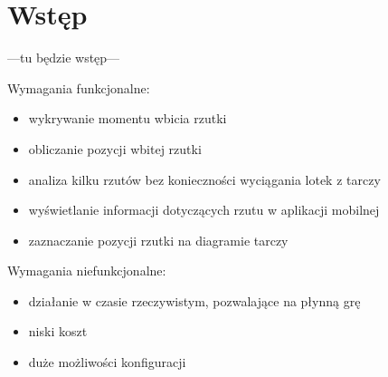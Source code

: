 \chapter{Wstęp}
\thispagestyle{chapterBeginStyle}
---tu będzie wstęp---


Wymagania funkcjonalne:
\begin{itemize}
  \item wykrywanie momentu wbicia rzutki
  \item obliczanie pozycji wbitej rzutki
  \item analiza kilku rzutów bez konieczności wyciągania lotek z tarczy
  \item wyświetlanie informacji dotyczących rzutu w aplikacji mobilnej
  \item zaznaczanie pozycji rzutki na diagramie tarczy
  
\end{itemize}

Wymagania niefunkcjonalne:
\begin{itemize}
  \item działanie w czasie rzeczywistym, pozwalające na płynną grę
  \item niski koszt
  \item duże możliwości konfiguracji
\end{itemize}